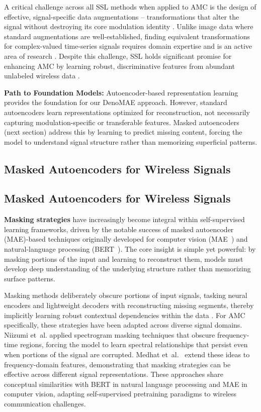 A critical challenge across all SSL methods when applied to AMC is the design of effective, signal-specific data augmentations – transformations that alter the signal without destroying its core modulation identity \cite{wang2024semi}. Unlike image data where standard augmentations are well-established, finding equivalent transformations for complex-valued time-series signals requires domain expertise and is an active area of research \cite{islam2024systematic}. Despite this challenge, SSL holds significant promise for enhancing AMC by learning robust, discriminative features from abundant unlabeled wireless data \cite{wu2022deep}.

\textbf{Path to Foundation Models:} Autoencoder-based representation learning provides the foundation for our DenoMAE approach. However, standard autoencoders learn representations optimized for reconstruction, not necessarily capturing modulation-specific or transferable features. Masked autoencoders (next section) address this by learning to predict missing content, forcing the model to understand signal structure rather than memorizing superficial patterns.

\subsection{Masked Autoencoders for Wireless Signals}

\subsection{Masked Autoencoders for Wireless Signals}

\textbf{Masking strategies} have increasingly become integral within self-supervised learning frameworks, driven by the notable success of masked autoencoder (MAE)-based techniques originally developed for computer vision (MAE~\cite{he2022mae}) and natural-language processing (BERT~\cite{vaswani2017attention}). The core insight is simple yet powerful: by masking portions of the input and learning to reconstruct them, models must develop deep understanding of the underlying structure rather than memorizing surface patterns.

Masking methods deliberately obscure portions of input signals, tasking neural encoders and lightweight decoders with reconstructing missing segments, thereby implicitly learning robust contextual dependencies within the data \cite{he2022mae}. For AMC specifically, these strategies have been adapted across diverse signal domains. Niizumi et~al. \cite{niizumi2022masked} applied spectrogram masking techniques that obscure frequency-time regions, forcing the model to learn spectral relationships that persist even when portions of the signal are corrupted. Medhat et~al.~\cite{medhat2020masked} extend these ideas to frequency-domain features, demonstrating that masking strategies can be effective across different signal representations. These approaches share conceptual similarities with BERT in natural language processing and MAE in computer vision, adapting self-supervised pretraining paradigms to wireless communication challenges.

